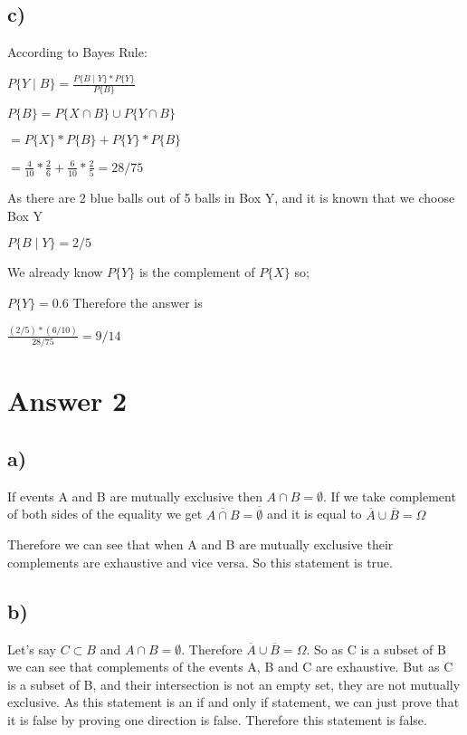 \documentclass[12pt]{article}
\begin{document}
\subsection*{c)}
According to Bayes Rule: \\ \par
$ P \lbrace Y \mid B \rbrace = \frac{P \lbrace B \mid Y \rbrace \ast P \lbrace Y \rbrace}{P \lbrace B \rbrace}$\\ \par 
$P \lbrace B \rbrace = P \lbrace X \cap B \rbrace \cup P \lbrace Y \cap B \rbrace$\\ \par
$= P \lbrace X \rbrace \ast P \lbrace B \rbrace + P \lbrace Y \rbrace \ast P \lbrace B \rbrace$\\ \par 
$= \frac{4}{10} \ast \frac{2}{6} + \frac{6}{10} \ast \frac{2}{5} = 28/75$ \\ \par 
As there are 2 blue balls out of 5 balls in Box Y, and it is known that we choose Box Y\\ \par 
$ P \lbrace B \mid Y \rbrace = 2/5$ \\ \par 
We already know $P \lbrace Y \rbrace$ is the complement of $P \lbrace X \rbrace$ so;\\ \par 
$P \lbrace Y \rbrace = 0.6$
Therefore the answer is \\ \par 
$\frac{(2/5) \ast (6/10)}{28/75} = 9/14$

\section*{Answer 2}
\subsection*{a)}
If events A and B are mutually exclusive then $A \cap B = \emptyset$. If we take complement of both sides of the equality we get $\overline{A \cap B} = \overline{\emptyset}$ and it is equal to $\overline{A} \cup \overline{B} = \Omega$\\ \par 
Therefore we can see that when A and B are mutually exclusive their complements are exhaustive and vice versa. So this statement is true.
\subsection*{b)}
Let's say $C \subset B$ and $A \cap B = \emptyset$. Therefore  
$\overline{A} \cup \overline{B} = \Omega$. So as C is a subset of B we can see that complements of the events A, B and C are exhaustive. But as C is a subset of B, and their intersection is not an empty set, they are not mutually exclusive. As this statement is an if and only if statement, we can just prove that it is false by proving one direction is false. Therefore this statement is false.
\end{document}
